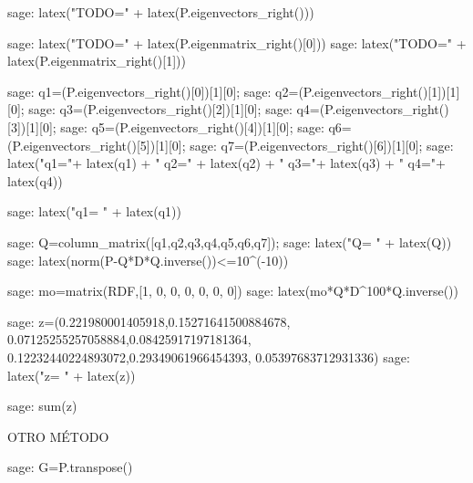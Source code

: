 \begin{sagecommandline}
    sage: latex("TODO=" + latex(P.eigenvectors_right()))
\end{sagecommandline}
    
\begin{sagecommandline}
    sage: latex("TODO=" + latex(P.eigenmatrix_right()[0]))
    sage: latex("TODO=" + latex(P.eigenmatrix_right()[1]))
\end{sagecommandline}
    
\begin{sagecommandline}
    sage: q1=(P.eigenvectors_right()[0])[1][0];
    sage: q2=(P.eigenvectors_right()[1])[1][0];
    sage: q3=(P.eigenvectors_right()[2])[1][0];
    sage: q4=(P.eigenvectors_right()[3])[1][0];
    sage: q5=(P.eigenvectors_right()[4])[1][0];
    sage: q6=(P.eigenvectors_right()[5])[1][0];
    sage: q7=(P.eigenvectors_right()[6])[1][0];
    sage: latex("q1="+ latex(q1) + " q2=" + latex(q2) + " q3="+ latex(q3) + " q4="+ latex(q4))
\end{sagecommandline}
    
\begin{sagecommandline}
    sage: latex("q1= " + latex(q1))
\end{sagecommandline}
    
\begin{sagecommandline}
    sage: Q=column_matrix([q1,q2,q3,q4,q5,q6,q7]);
    sage: latex("Q= " + latex(Q))
    sage: latex(norm(P-Q*D*Q.inverse())<=10^(-10))
\end{sagecommandline}
    
\begin{sagecommandline}
    sage: mo=matrix(RDF,[1, 0, 0, 0, 0, 0, 0])
    sage: latex(mo*Q*D^100*Q.inverse())
\end{sagecommandline}
    
\begin{sagecommandline}
    sage: z=(0.221980001405918,0.15271641500884678, 0.07125255257058884,0.08425917197181364, 0.12232440224893072,0.29349061966454393, 0.05397683712931336)
    sage: latex("z= " + latex(z))
\end{sagecommandline}
    
\begin{sagecommandline}
    sage: sum(z)
\end{sagecommandline}
    
\par OTRO MÉTODO
    
\begin{sagecommandline}
    sage: G=P.transpose()
\end{sagecommandline}
    
